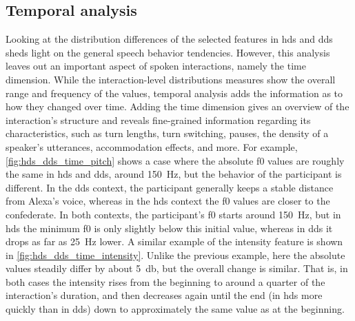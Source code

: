 \subsection{Temporal analysis}
\label{subsec:temporal_analysis}

Looking at the distribution differences of the selected features in \ac{hds} and \ac{dds} sheds light on the general speech behavior tendencies.
However, this analysis leaves out an important aspect of spoken interactions, namely the time dimension.
While the interaction-level distributions measures show the overall range and frequency of the values, temporal analysis adds the information as to how they changed over time.
Adding the time dimension gives an overview of the interaction's structure and reveals fine-grained information regarding its characteristics, such as turn lengths, turn switching, pauses, the density of a speaker's utterances, accommodation effects, and more.
For example, \cref{fig:hds_dds_time_pitch} shows a case where the absolute \ac{f0} values are roughly the same in \ac{hds} and \ac{dds}, around \SI{150}{\hertz}, but the behavior of the participant is different.
In the \ac{dds} context, the participant generally keeps a stable distance from Alexa's voice, whereas in the \ac{hds} context the \ac{f0} values are closer to the confederate.
In both contexts, the participant's \ac{f0} starts around \SI{150}{\hertz}, but in \ac{hds} the minimum \ac{f0} is only slightly below this initial value, whereas in \ac{dds} it drops as far as \SI{25}{\hertz} lower.
A similar example of the intensity feature is shown in \cref{fig:hds_dds_time_intensity}.
Unlike the previous example, here the absolute values steadily differ by about \SI{5}{\decibel}, but the overall change is similar.
That is, in both cases the intensity rises from the beginning to around a quarter of the interaction's duration, and then decreases again until the end (in \ac{hds} more quickly than in \ac{dds}) down to approximately the same value as at the beginning.

